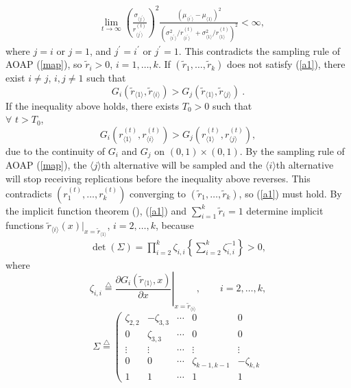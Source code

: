 \documentclass[journal]{IEEEtran}
\newcommand{\ed}{\stackrel{\triangle}{=}}
\begin{document}
\begin{IEEEproof}
\begin{align*}
    &\lim_{t\to\infty} \left(\frac{\sigma_{\langle j^{'}\rangle}}{r_{\langle j^{'}\rangle}^{(t)}}\right)^2 \frac{(\mu_{\langle i^{'}\rangle}-\mu_{\langle 1 \rangle})^2}{\left(\sigma_{\langle i^{'}\rangle}^2/r_{\langle i^{'}\rangle}^{(t)}+\sigma_{\langle 1 \rangle}^2/r_{\langle 1 \rangle}^{(t)}\right)^2}<\infty, \end{align*}
    where $j=i$ or $j=1$, and $j^{'}=i^{'}$ or $j^{'}=1$. This  contradicts  the sampling rule of AOAP (\ref{map}), so $\widetilde{r}_i>0$, $i=1,\ldots,k$.  
    If $(\widetilde{r}_1,\ldots,\widetilde{r}_k)$ does not satisfy (\ref{a1}), there exist $i\neq j$, $i,j\neq 1$ such that 
    $$G_i(\widetilde{r}_{\langle 1 \rangle},\widetilde{r}_{\langle i \rangle})>G_j(\widetilde{r}_{\langle 1 \rangle},\widetilde{r}_{\langle j\rangle})~.$$
    If the inequality above holds, there exists $T_0>0$ such that\\
     $\forall$ $t>T_0$, 
     $$G_i(r^{(t)}_{\langle 1 \rangle},r^{(t)}_{\langle i \rangle})>G_j(r^{(t)}_{\langle 1 \rangle},r^{(t)}_{\langle j\rangle}),$$
     due to the continuity of $G_i$ and $G_j$ on $(0,1)\times(0,1)$. By the  sampling rule of AOAP (\ref{map}), the $\langle j\rangle$th alternative will be sampled and the $\langle i \rangle$th alternative will stop receiving replications before the inequality above reverses. This contradicts $(r_1^{(t)},\ldots,r_k^{(t)})$ converging to $(\widetilde{r}_1,\ldots,\widetilde{r}_k)$, so (\ref{a1}) must hold. By the implicit function theorem (\cite{rudin1964principles}), (\ref{a1}) and $\sum_{i=1}^{k} \widetilde{r}_i=1$ determine implicit functions  $\widetilde{r}_{\langle i \rangle}(x)|_{x=\widetilde{r}_{\langle 1 \rangle}}$, $i=2,\ldots,k$, because 
     \begin{align*}
     \det(\Sigma)=\prod_{i=2}^{k}\zeta_{i,i}
     \left\{\sum_{i=2}^{k}\zeta_{i,i}^{-1}\right\}>0, \end{align*}
      where    
      $$\zeta_{i,i}\ed\left.\frac{\partial G_i(\widetilde{r}_{\langle 1 \rangle},x)}{\partial x}\right|_{x=\widetilde{r}_{\langle i \rangle}},\qquad i=2,\ldots,k,$$
          $$
           \Sigma \ed\left( \begin{array}{cccccc}
           \zeta_{2,2}& -\zeta_{3,3} & \cdots & 0&0\\
           0& \zeta_{3,3}& \cdots & 0&0 \\
           \vdots  & \vdots & \cdots & \vdots &\vdots\\
            0 & 0 & \cdots & \zeta_{k-1,k-1}&-\zeta_{k,k}\\
           1 & 1 & \cdots & 1& 1

\end{array}$$
\end{IEEEproof}
\end{document}
